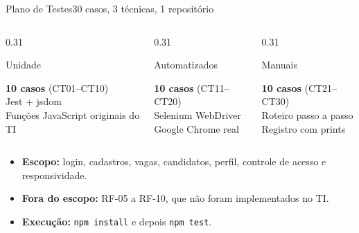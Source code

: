\documentclass[aspectratio=169]{beamer}
\newcommand{\caixa}[2]{\parbox[t][#1][t]{\linewidth}{\raggedright #2}}
\begin{document}
\begin{frame}{Plano de Testes}{30 casos, 3 técnicas, 1 repositório}
  \begin{columns}[T,onlytextwidth]
    \begin{column}{0.31\textwidth}
      \begin{block}{Unidade}
        \small\caixa{2.3cm}{\textbf{10 casos} (CT01--CT10)\\Jest + jsdom\\Funções JavaScript originais do TI}
      \end{block}
    \end{column}
    \hfill
    \begin{column}{0.31\textwidth}
      \begin{block}{Automatizados}
        \small\caixa{2.3cm}{\textbf{10 casos} (CT11--CT20)\\Selenium WebDriver\\Google Chrome real}
      \end{block}
    \end{column}
    \hfill
    \begin{column}{0.31\textwidth}
      \begin{block}{Manuais}
        \small\caixa{2.3cm}{\textbf{10 casos} (CT21--CT30)\\Roteiro passo a passo\\Registro com prints}
      \end{block}
    \end{column}
  \end{columns}
  \vspace{3mm}
  \small
  \begin{itemize}
    \item \textbf{Escopo:} login, cadastros, vagas, candidatos, perfil, controle de acesso e responsividade.
    \item \textbf{Fora do escopo:} RF-05 a RF-10, que não foram implementados no TI.
    \item \textbf{Execução:} \texttt{npm install} e depois \texttt{npm test}.
  \end{itemize}
\end{frame}

\end{document}
